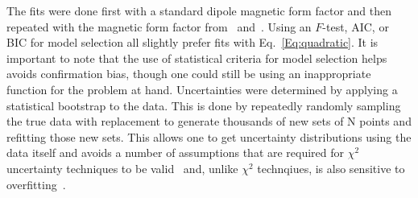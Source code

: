 \documentclass[10pt,aps,prc,twocolumn]{revtex4-1}
\begin{document}
The fits were done first with a standard dipole magnetic form factor
and then repeated with the magnetic form factor from~\cite{Bernauer:2013tpr} and~\cite{Ye:2017gyb}.    
Using an $F$-test, AIC, or BIC for model selection all slightly prefer fits with Eq.~\ref{Eq:quadratic}.
It is important to note that the use of statistical criteria for model selection helps avoids confirmation bias,
though one could still be using an inappropriate function for the problem at hand. 
Uncertainties were determined by applying a statistical bootstrap to the data.   This is done
by repeatedly randomly sampling the true data with replacement to generate thousands of new sets of N points 
and refitting those new sets.   This allows one to get uncertainty distributions using the data itself and
avoids a number of assumptions that are required for $\chi^2$ uncertainty techniques 
to be valid~\cite{Efron:1979} and, unlike $\chi^2$ technqiues, is also sensitive to overfitting~\cite{Andrae:2010}.
\end{document}
